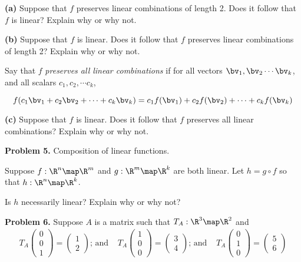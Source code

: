 \documentclass[oneside,12pt]{amsart}
\begin{document}
\bigskip

\textbf{(a)} Suppose that $f$ preserves linear combinations of length 2.
Does it follow that $f$ is linear? Explain why or why not.

\bigskip
\bigskip

\textbf{(b)} Suppose that $f$ is linear. Does it follow that $f$ preserves
linear combinations of length 2? Explain why or why not.

\bigskip
\bigskip

Say that $f$ \emph{preserves all linear combinations} if
for all vectors $\bv_1,\bv_2 \cdots \bv_k$, and all scalars
$c_1, c_2, \cdots c_k$,

$$f(c_1 \bv_1 + c_2 \bv_2 + \cdots + c_k \bv_k)
= c_1 f(\bv_1) + c_2 f(\bv_2) + \cdots + c_k f(\bv_k)$$

\bigskip

\textbf{(c)} Suppose that $f$ is linear. Does it follow that $f$ preserves
all linear combinations? Explain why or why not.

\bigskip
\bigskip

\textbf{Problem 5.} Composition of linear functions.

\smallskip

Suppose $f:\R^n\map\R^m$ and $g:\R^m\map\R^k$ are both linear.
Let $h=g\circ f$ so that $h:\R^n\map\R^k$.

\smallskip

Is $h$ necessarily linear? Explain why or why not?

\bigskip
\bigskip

\textbf{Problem 6.}  Suppose $A$ is a matrix such that $T_A:\R^3\map\R^2$ and
$$
\begin{matrix}
T_A \begin{pmatrix} 0 \\ 0 \\ 1 \end{pmatrix} = \begin{pmatrix} 1 \\ 2 \end{pmatrix}\text{; and }
&
T_A \begin{pmatrix} 1 \\ 0 \\ 0 \end{pmatrix} = \begin{pmatrix} 3 \\ 4 \end{pmatrix}\text{; and }
&
T_A \begin{pmatrix} 0 \\ 1 \\ 0 \end{pmatrix} = \begin{pmatrix} 5 \\ 6 \end{pmatrix}
\end{matrix}
$$
\end{document}
